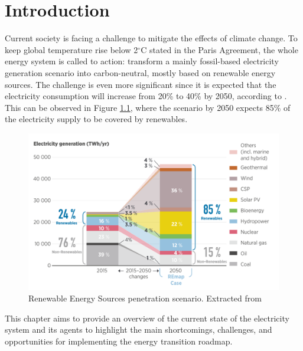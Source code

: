 \renewcommand\labelenumi{(\roman{enumi})}
\renewcommand\theenumi\labelenumi

\chapter{Introduction}
\label{chapterIntro}

Current society is facing a challenge to mitigate the effects of climate change. To keep global temperature rise below 2$^{\circ}$C stated in the Paris Agreement, the whole energy system is called to action: transform a mainly fossil-based electricity generation scenario into carbon-neutral, mostly based on renewable energy sources. The challenge is even more significant since it is expected that the electricity consumption will increase from 20\% to 40\% by 2050, according to \cite{IRENA2018}. This can be observed in Figure \ref{fig:scenarios}, where the scenario by 2050 expects 85\% of the electricity supply to be covered by renewables. 

\vspace*{3mm}
\begin{figure}[htbp]
	\centering 
	\includegraphics[width=1\columnwidth ]{ChapterIntro/Figures/irena_scenarios.png}
		\caption{Renewable Energy Sources penetration scenario. Extracted from \cite{IRENA2018}}  
		\label{fig:scenarios}
\end{figure}
\newpage
This chapter aims to provide an overview of the current state of the electricity system and its agents to highlight the main shortcomings, challenges, and opportunities for implementing the energy transition roadmap. 

